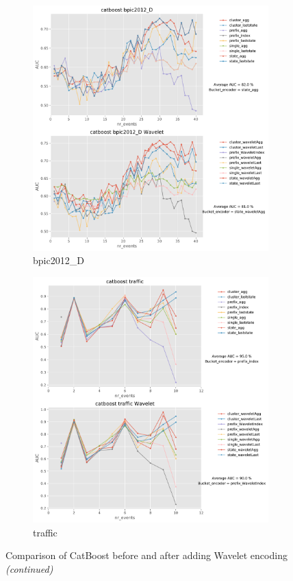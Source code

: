 \documentclass[twoside,11pt]{Latex/Classes/PhDthesisPSnPDF}
\begin{document}
\begin{figure}[!htbp]
	\medskip
	\begin{subfigure}{0.48\textwidth}
		\includegraphics[width=\linewidth]{images/wavelet/graphs2cat/bpic2012_D.pdf}	
		\caption{bpic2012\_D} 
	\end{subfigure}\hspace*{\fill}
	\begin{subfigure}{0.48\textwidth}
		\includegraphics[width=\linewidth]{images/wavelet/graphs2cat/traffic.pdf}
		\caption{traffic}
	\end{subfigure}
		\caption{Comparison of CatBoost before and after adding Wavelet encoding \textit{(continued)}}
	\label{fig:wc2}
\end{figure}
\end{document}
